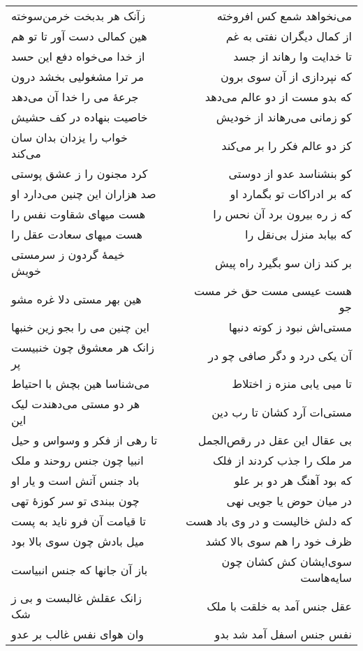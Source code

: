 \begin{center}
\begin{longtable}{l p{0.5cm} r}
\\
زآنک هر بدبخت خرمن‌سوخته
&&
می‌نخواهد شمع کس افروخته
\\
هین کمالی دست آور تا تو هم
&&
از کمال دیگران نفتی به غم
\\
از خدا می‌خواه دفع این حسد
&&
تا خدایت وا رهاند از جسد
\\
مر ترا مشغولیی بخشد درون
&&
که نپردازی از آن سوی برون
\\
جرعهٔ می را خدا آن می‌دهد
&&
که بدو مست از دو عالم می‌دهد
\\
خاصیت بنهاده در کف حشیش
&&
کو زمانی می‌رهاند از خودیش
\\
خواب را یزدان بدان سان می‌کند
&&
کز دو عالم فکر را بر می‌کند
\\
کرد مجنون را ز عشق پوستی
&&
کو بنشناسد عدو از دوستی
\\
صد هزاران این چنین می‌دارد او
&&
که بر ادراکات تو بگمارد او
\\
هست میهای شقاوت نفس را
&&
که ز ره بیرون برد آن نحس را
\\
هست میهای سعادت عقل را
&&
که بیابد منزل بی‌نقل را
\\
خیمهٔ گردون ز سرمستی خویش
&&
بر کند زان سو بگیرد راه پیش
\\
هین بهر مستی دلا غره مشو
&&
هست عیسی مست حق خر مست جو
\\
این چنین می را بجو زین خنبها
&&
مستی‌اش نبود ز کوته دنبها
\\
زانک هر معشوق چون خنبیست پر
&&
آن یکی درد و دگر صافی چو در
\\
می‌شناسا هین بچش با احتیاط
&&
تا میی یابی منزه ز اختلاط
\\
هر دو مستی می‌دهندت لیک این
&&
مستی‌ات آرد کشان تا رب دین
\\
تا رهی از فکر و وسواس و حیل
&&
بی عقال این عقل در رقص‌الجمل
\\
انبیا چون جنس روحند و ملک
&&
مر ملک را جذب کردند از فلک
\\
باد جنس آتش است و یار او
&&
که بود آهنگ هر دو بر علو
\\
چون ببندی تو سر کوزهٔ تهی
&&
در میان حوض یا جویی نهی
\\
تا قیامت آن فرو ناید به پست
&&
که دلش خالیست و در وی باد هست
\\
میل بادش چون سوی بالا بود
&&
ظرف خود را هم سوی بالا کشد
\\
باز آن جانها که جنس انبیاست
&&
سوی‌ایشان کش کشان چون سایه‌هاست
\\
زانک عقلش غالبست و بی ز شک
&&
عقل جنس آمد به خلقت با ملک
\\
وان هوای نفس غالب بر عدو
&&
نفس جنس اسفل آمد شد بدو
\\

\end{longtable}
\end{center}
